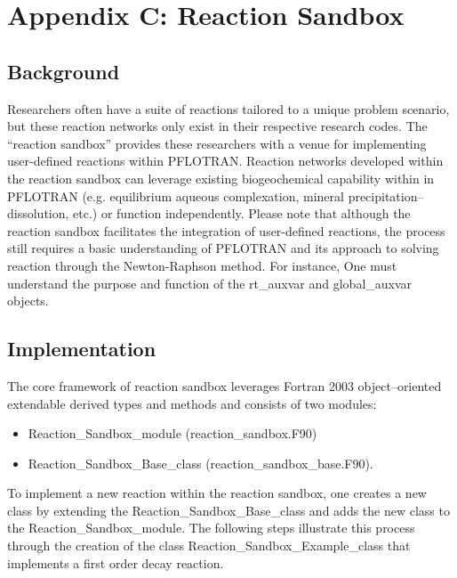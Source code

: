 \section*{Appendix C: Reaction Sandbox}


\setcounter{section}{3}
\setcounter{subsection}{0}
\setcounter{equation}{0}
\setcounter{table}{0}
\setcounter{figure}{0}

\subsection{Background}

Researchers often have a suite of reactions tailored to a unique problem scenario, but these reaction networks only exist in their respective research codes. The ``reaction sandbox'' provides these researchers with a venue for implementing user-defined reactions within PFLOTRAN. Reaction networks developed within the reaction sandbox can leverage existing biogeochemical capability within in PFLOTRAN (e.g. equilibrium aqueous complexation, mineral precipitation--dissolution, etc.) or function independently. Please note that although the reaction sandbox facilitates the integration of user-defined reactions, the process still requires a basic understanding of PFLOTRAN and its approach to solving reaction through the Newton-Raphson method. For instance,  One must understand the purpose and function of the rt\_auxvar and global\_auxvar objects.

\subsection{Implementation}
The core framework of reaction sandbox leverages Fortran 2003 object--oriented extendable derived types and methods and consists of two modules:

\begin{itemize}
  \item[] Reaction\_Sandbox\_module (reaction\_sandbox.F90)
  \item[] Reaction\_Sandbox\_Base\_class (reaction\_sandbox\_base.F90).
\end{itemize}

To implement a new reaction within the reaction sandbox, one creates a new class by extending the Reaction\_Sandbox\_Base\_class and adds the new class to the Reaction\_Sandbox\_module.  The following steps illustrate this process through the creation of the class Reaction\_Sandbox\_Example\_class that implements a first order decay reaction.


